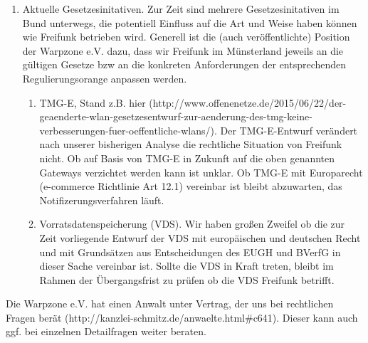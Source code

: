 \documentclass{article}
\begin{document}
\begin{enumerate}
\item Aktuelle Gesetzesinitativen. Zur Zeit sind mehrere Gesetzesinitativen im Bund unterwegs, die potentiell Einfluss auf die Art und Weise haben können wie Freifunk betrieben wird. Generell ist die (auch veröffentlichte) Position der Warpzone e.V. dazu, dass wir Freifunk im Münsterland jeweils an die gültigen Gesetze bzw an die konkreten Anforderungen der entsprechenden Regulierungsorange anpassen werden.
	\begin{enumerate}
		\item TMG-E, Stand z.B. hier (http://www.offenenetze.de/2015/06/22/der-geaenderte-wlan-gesetzesentwurf-zur-aenderung-des-tmg-keine-verbesserungen-fuer-oeffentliche-wlans/). Der TMG-E-Entwurf verändert nach unserer bisherigen Analyse die rechtliche Situation von Freifunk nicht. Ob auf Basis von TMG-E in Zukunft auf die oben genannten Gateways verzichtet werden kann ist unklar. Ob TMG-E mit Europarecht (e-commerce Richtlinie Art 12.1) vereinbar ist bleibt abzuwarten, das Notifizerungsverfahren läuft.
		\item Vorratsdatenspeicherung (VDS). Wir haben großen Zweifel ob die zur Zeit vorliegende Entwurf der VDS mit europäischen und deutschen Recht und mit Grundsätzen aus Entscheidungen des EUGH und BVerfG in dieser Sache vereinbar ist. Sollte die VDS in Kraft treten, bleibt im Rahmen der Übergangsfrist zu prüfen ob die VDS Freifunk betrifft.
	\end{enumerate}
\end{enumerate}

Die Warpzone e.V. hat einen Anwalt unter Vertrag, der uns bei rechtlichen Fragen berät (http://kanzlei-schmitz.de/anwaelte.html\#c641). Dieser kann auch ggf. bei einzelnen Detailfragen weiter beraten.
\end{document}
